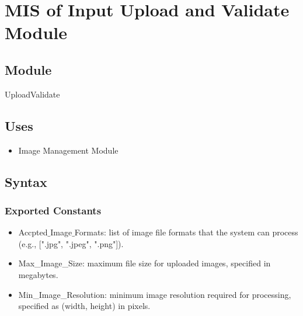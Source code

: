 \documentclass[12pt, titlepage]{article}
\begin{document}
\section{MIS of Input Upload and Validate Module} \label{m1} 

\subsection{Module}

UploadValidate

\subsection{Uses}
\begin{itemize}
    \item Image Management Module
\end{itemize}
\subsection{Syntax}

\subsubsection{Exported Constants}
\begin{itemize}
    \item Accpted$\_$Image$\_$Formats: list of image file formats that the system can process (e.g., [".jpg", ".jpeg", ".png"]).
    \item Max\_Image\_Size: maximum file size for uploaded images, specified in megabytes.
    \item Min\_Image\_Resolution: minimum image resolution required for processing, specified as (width, height) in pixels.
\end{itemize}
\end{document}

